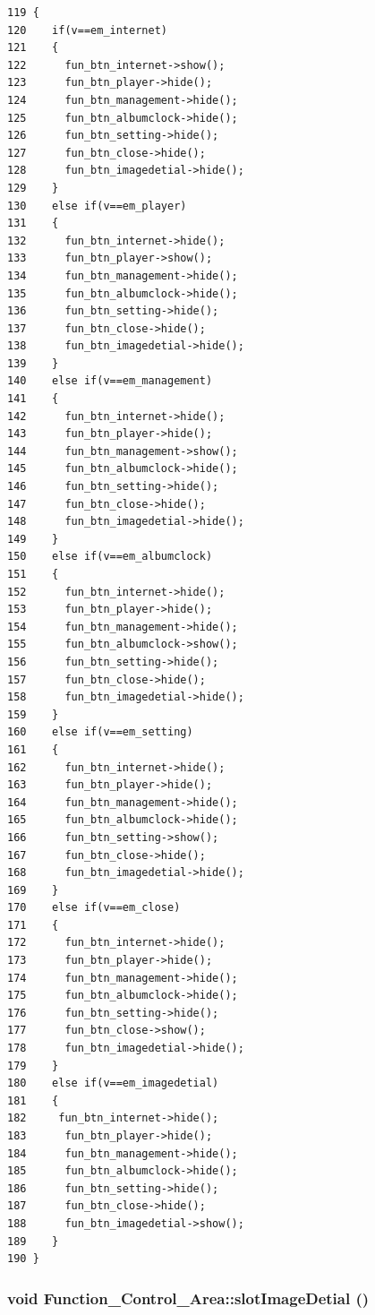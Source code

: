 \footnotesize\begin{verbatim}119 {
120    if(v==em_internet)
121    {
122      fun_btn_internet->show();
123      fun_btn_player->hide();
124      fun_btn_management->hide();
125      fun_btn_albumclock->hide();
126      fun_btn_setting->hide();
127      fun_btn_close->hide();
128      fun_btn_imagedetial->hide();
129    }
130    else if(v==em_player)
131    {
132      fun_btn_internet->hide();
133      fun_btn_player->show();
134      fun_btn_management->hide();
135      fun_btn_albumclock->hide();
136      fun_btn_setting->hide();
137      fun_btn_close->hide();
138      fun_btn_imagedetial->hide();
139    }
140    else if(v==em_management)
141    {
142      fun_btn_internet->hide();
143      fun_btn_player->hide();
144      fun_btn_management->show();
145      fun_btn_albumclock->hide();
146      fun_btn_setting->hide();
147      fun_btn_close->hide();
148      fun_btn_imagedetial->hide();
149    }
150    else if(v==em_albumclock)
151    {
152      fun_btn_internet->hide();
153      fun_btn_player->hide();
154      fun_btn_management->hide();
155      fun_btn_albumclock->show();
156      fun_btn_setting->hide();
157      fun_btn_close->hide();
158      fun_btn_imagedetial->hide();
159    }
160    else if(v==em_setting)
161    {
162      fun_btn_internet->hide();
163      fun_btn_player->hide();
164      fun_btn_management->hide();
165      fun_btn_albumclock->hide();
166      fun_btn_setting->show();
167      fun_btn_close->hide();
168      fun_btn_imagedetial->hide();
169    }
170    else if(v==em_close)
171    {
172      fun_btn_internet->hide();
173      fun_btn_player->hide();
174      fun_btn_management->hide();
175      fun_btn_albumclock->hide();
176      fun_btn_setting->hide();
177      fun_btn_close->show();
178      fun_btn_imagedetial->hide();
179    }
180    else if(v==em_imagedetial)
181    {
182     fun_btn_internet->hide();
183      fun_btn_player->hide();
184      fun_btn_management->hide();
185      fun_btn_albumclock->hide();
186      fun_btn_setting->hide();
187      fun_btn_close->hide();
188      fun_btn_imagedetial->show();
189    }
190 }
\end{verbatim}\normalsize 
{}
\subsubsection{\setlength{\rightskip}{0pt plus 5cm}void Function\_\-Control\_\-Area::slot\-Image\-Detial ()\hspace{0.3cm}{\tt  [slot]}}\label{classFunction__Control__Area_Function__Control__Areai2}




